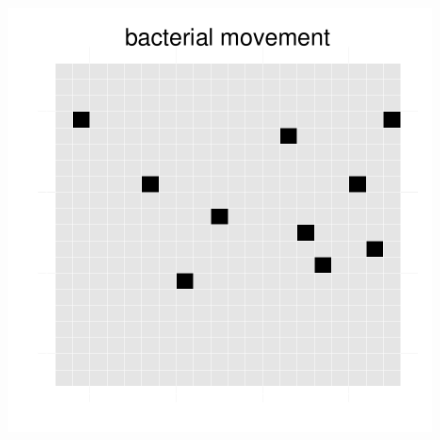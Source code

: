 \begin{figure}[h]
{\begin{minipage}[t]{0.3\textwidth}
  \end{minipage}
  \begin{minipage}[t]{0.3\textwidth}
    \includegraphics[width=\textwidth]{../results/barkeri_20x20_seed9659_bac130.pdf}
  \end{minipage}
  }
\end{figure}
